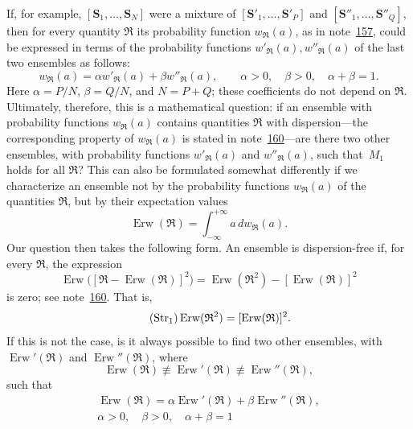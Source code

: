 \documentclass[fontsize=13pt,twoside,openany,headings=normal,parskip=false,bookmarkpackage=false,DIV=calc]{scrbook}
\begin{document}
If, for example, $[\boldsymbol{S}_1,\ldots,\boldsymbol{S}_N]$ were a mixture of $[\boldsymbol{S}'_1,\ldots,\boldsymbol{S}'_P]$ and $[\boldsymbol{S}''_1,\ldots,\boldsymbol{S}''_Q]$, then for every quantity $\mathfrak R$ its probability function $w_{\mathfrak R}(a)$, as in note~\hyperlink{note-157}{157}, could be expressed in terms of the probability functions $w'_{\mathfrak R}(a),w''_{\mathfrak R}(a)$ of the last two ensembles as follows:
\begin{equation}\tag{$M_1$}\label{eq:IV.1.M1}
w_{\mathfrak R}(a)=\alpha w'_{\mathfrak R}(a)+\beta w''_{\mathfrak R}(a),\qquad
\alpha>0,\quad\beta>0,\quad\alpha+\beta=1.
\end{equation}
Here $\alpha=P/N$, $\beta=Q/N$, and $N=P+Q$; these coefficients do not depend on $\mathfrak R$. Ultimately, therefore, this is a mathematical question: if an ensemble with probability functions $w_{\mathfrak R}(a)$ contains quantities $\mathfrak R$ with dispersion---the corresponding property of $w_{\mathfrak R}(a)$ is stated in note~\hyperlink{note-160}{160}---are there two other ensembles, with probability functions $w'_{\mathfrak R}(a)$ and $w''_{\mathfrak R}(a)$, such that~\hyperref[eq:IV.1.M1]{$M_1$} holds for all $\mathfrak R$? This can also be formulated somewhat differently if we characterize an ensemble not by the probability functions $w_{\mathfrak R}(a)$ of the quantities $\mathfrak R$, but by their expectation values
\[
\operatorname{Erw}(\mathfrak R)=\int_{-\infty}^{+\infty}a\,dw_{\mathfrak R}(a).
\]
Our question then takes the following form. An ensemble is
\hypertarget{origpage-163}{}%
dispersion-free if, for every $\mathfrak R$, the expression
\[
\operatorname{Erw}\bigl([\mathfrak R-\operatorname{Erw}(\mathfrak R)]^2\bigr)
=\operatorname{Erw}(\mathfrak R^2)-[\operatorname{Erw}(\mathfrak R)]^2
\]
is zero; see note~\hyperlink{note-160}{160}. That is,
\begin{equation}\tag{$\mathrm{Str}_1$}\label{eq:IV.1.Str1}
\operatorname{Erw}(\mathfrak R^2)=[\operatorname{Erw}(\mathfrak R)]^2.
\end{equation}
If this is not the case, is it always possible to find two other ensembles, with $\operatorname{Erw}'(\mathfrak R)$ and $\operatorname{Erw}''(\mathfrak R)$, where
\[
\operatorname{Erw}(\mathfrak R)\not\equiv\operatorname{Erw}'(\mathfrak R)
\not\equiv\operatorname{Erw}''(\mathfrak R),
\]
such that
\begin{equation}\tag{$M_2$}\label{eq:IV.1.M2}
\begin{gathered}
\operatorname{Erw}(\mathfrak R)=\alpha\operatorname{Erw}'(\mathfrak R)+\beta\operatorname{Erw}''(\mathfrak R),\\
\alpha>0,\quad\beta>0,\quad\alpha+\beta=1
\end{gathered}
\end{equation}
\end{document}

